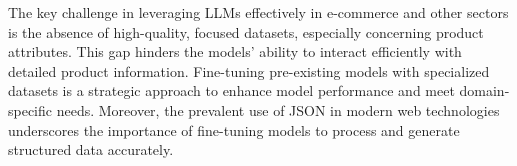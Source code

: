 The key challenge in leveraging LLMs effectively in e-commerce and other sectors is the absence of high-quality, focused datasets, especially concerning product attributes. This gap hinders the models' ability to interact efficiently with detailed product information. Fine-tuning pre-existing models with specialized datasets is a strategic approach to enhance model performance and meet domain-specific needs. Moreover, the prevalent use of JSON in modern web technologies underscores the importance of fine-tuning models to process and generate structured data accurately.